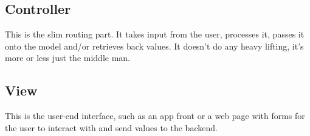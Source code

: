 \subsection{Controller}%
\label{sub:controller}

This is the slim routing part. It takes input from the user, processes it, passes it onto the model and/or retrieves back values. It doesn't do any heavy lifting, it's more or less just the middle man.

\subsection{View}%
\label{sub:view}

This is the user-end interface, such as an app front or a web page with forms for the user to interact with and send values to the backend.
